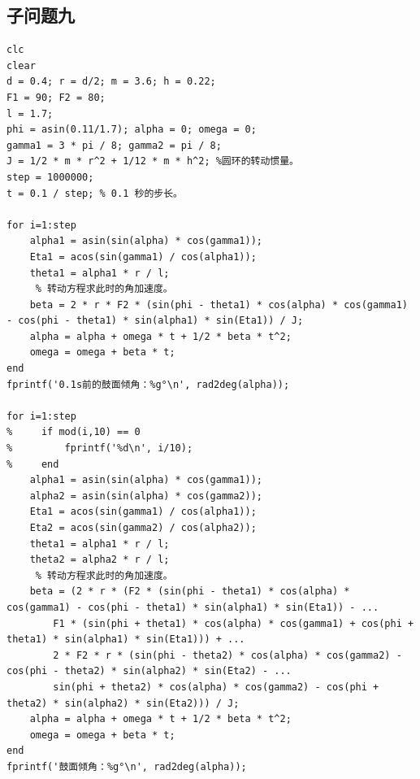 \documentclass{cumcm}
\begin{document}
\subsection{子问题九}
\begin{lstlisting}
clc
clear
d = 0.4; r = d/2; m = 3.6; h = 0.22;
F1 = 90; F2 = 80;
l = 1.7;
phi = asin(0.11/1.7); alpha = 0; omega = 0;
gamma1 = 3 * pi / 8; gamma2 = pi / 8;
J = 1/2 * m * r^2 + 1/12 * m * h^2; %圆环的转动惯量。
step = 1000000;
t = 0.1 / step; % 0.1 秒的步长。

for i=1:step
    alpha1 = asin(sin(alpha) * cos(gamma1));
    Eta1 = acos(sin(gamma1) / cos(alpha1));
    theta1 = alpha1 * r / l;
     % 转动方程求此时的角加速度。
    beta = 2 * r * F2 * (sin(phi - theta1) * cos(alpha) * cos(gamma1) - cos(phi - theta1) * sin(alpha1) * sin(Eta1)) / J;
    alpha = alpha + omega * t + 1/2 * beta * t^2;
    omega = omega + beta * t;
end
fprintf('0.1s前的鼓面倾角：%g°\n', rad2deg(alpha));

for i=1:step
%     if mod(i,10) == 0
%         fprintf('%d\n', i/10);
%     end
    alpha1 = asin(sin(alpha) * cos(gamma1));
    alpha2 = asin(sin(alpha) * cos(gamma2));
    Eta1 = acos(sin(gamma1) / cos(alpha1));
    Eta2 = acos(sin(gamma2) / cos(alpha2));
    theta1 = alpha1 * r / l;
    theta2 = alpha2 * r / l;
     % 转动方程求此时的角加速度。
    beta = (2 * r * (F2 * (sin(phi - theta1) * cos(alpha) * cos(gamma1) - cos(phi - theta1) * sin(alpha1) * sin(Eta1)) - ...
        F1 * (sin(phi + theta1) * cos(alpha) * cos(gamma1) + cos(phi + theta1) * sin(alpha1) * sin(Eta1))) + ...
        2 * F2 * r * (sin(phi - theta2) * cos(alpha) * cos(gamma2) - cos(phi - theta2) * sin(alpha2) * sin(Eta2) - ...
        sin(phi + theta2) * cos(alpha) * cos(gamma2) - cos(phi + theta2) * sin(alpha2) * sin(Eta2))) / J;
    alpha = alpha + omega * t + 1/2 * beta * t^2;
    omega = omega + beta * t;
end
fprintf('鼓面倾角：%g°\n', rad2deg(alpha));
\end{lstlisting}
\end{document}

